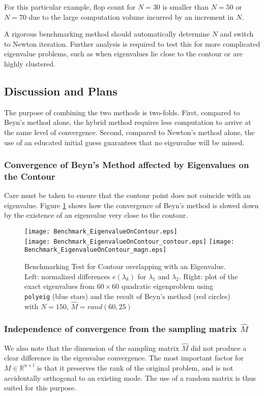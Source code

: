 \documentclass[11pt,letterpaper]{article}
\begin{document}
For this particular example, flop count for $N=30$ is smaller than $N=50$ or $N=70$ due to the large computation volume incurred by an increment in $N$. 

A rigorous benchmarking method should automatically determine $N$ and switch to Newton iteration. Further analysis is required to test this for more complicated eigenvalue problems, such as when eigenvalues lie close to the contour or are highly clustered.
\pagebreak
\subsection{Discussion and Plans}
The purpose of combining the two methods is two-folds. First, compared to Beyn's method alone, the hybrid method requires less computation to arrive at the same level of convergence. Second, compared to Newton's method alone, the use of an educated initial guess guarantees that no eigenvalue will be missed.
\subsubsection{Convergence of Beyn's Method affected by Eigenvalues on the Contour}
Care must be taken to ensure that the contour point does not coincide with an eigenvalue. Figure \ref{fig:overlap} shows how the convergence of Beyn's method is slowed down by the existence of an eigenvalue very close to the contour.
\begin{figure}\label{fig:overlap}
\begin{center}
\texttt{[image: Benchmark\_EigenvalueOnContour.eps]}\\
\texttt{[image: Benchmark\_EigenvalueOnContour\_contour.eps]}
\texttt{[image: Benchmark\_EigenvalueOnContour\_magn.eps]}
\end{center}
\caption{Benchmarking Test for Contour overlapping with an Eigenvalue. \textnormal{Left: normalized differences $e(\lambda_k)$ for $\lambda_1$ and $\lambda_2$. Right: plot of the exact eigenvalues from $60 \times 60$ quadratic eigenproblem using {\tt polyeig} (blue stars) and the result of Beyn's method (red circles) with $N=150$, $\hat{M}=rand(60,25)$}}
\end{figure}

\subsubsection{Independence of convergence from the sampling matrix $\hat{M}$}
We also note that the dimension of the sampling matrix $\hat{M}$ did not produce a clear difference in the eigenvalue convergence. The most important factor for $M\in \mathbb{R}^{n\times l}$ is that it preserves the rank of the original problem, and is not accidentally orthogonal to an existing mode. The use of a random matrix is thus suited for this purpose.
\end{document}
